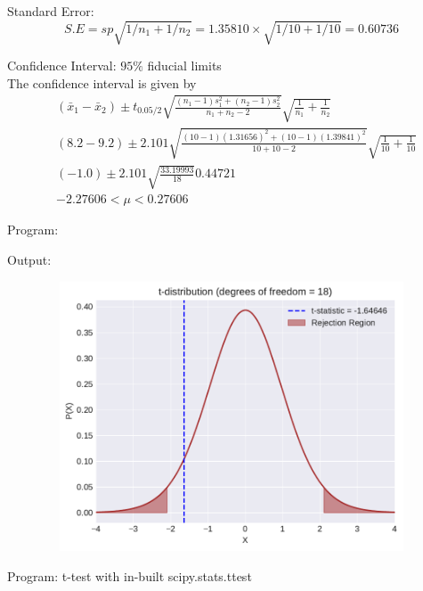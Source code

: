 \documentclass[a4paper,11pt,openright]{report}
\begin{document}
\begin{enumerate}
Standard Error:
\begin{equation*}
S.E = sp \sqrt{1/n_{1} + 1/n_{2}} = 1.35810 \times \sqrt{1/10 + 1/10} = 0.60736
\end{equation*}

Confidence Interval: $95\%$ fiducial limits \\
The confidence interval is given by
\begin{equation*}
\begin{split}
&(\bar x_{1} - \bar x_{2}) \pm t_{0.05/2} \sqrt{\frac{(n_{1} - 1)s_{1}^{2} + (n_{2} - 1)s_{2}^{2}}{n_{1} + n_{2} -2}} \sqrt{\frac{1}{n_{1}} + \frac{1}{n_{2}}} \\
&(8.2 - 9.2) \pm 2.101 \sqrt{\frac{(10 - 1)(1.31656)^{2} + (10 - 1)(1.39841)^{2}}{10 + 10 - 2}} \sqrt{\frac{1}{10} + \frac{1}{10}} \\
&(-1.0) \pm 2.101 \sqrt{\frac{33.19993}{18}} 0.44721 \\
&-2.27606 < \mu < 0.27606
\end{split}
\end{equation*}

\vspace{1cm}

Program:


\vspace{1cm}

Output:


\begin{figure}[ht!]
\includegraphics[width=16cm,height=8cm,keepaspectratio]{tscript3.pdf}
\centering
\end{figure}

\vspace{1cm}

Program: t-test with in-built scipy.stats.ttest



\end{enumerate}
\end{document}
